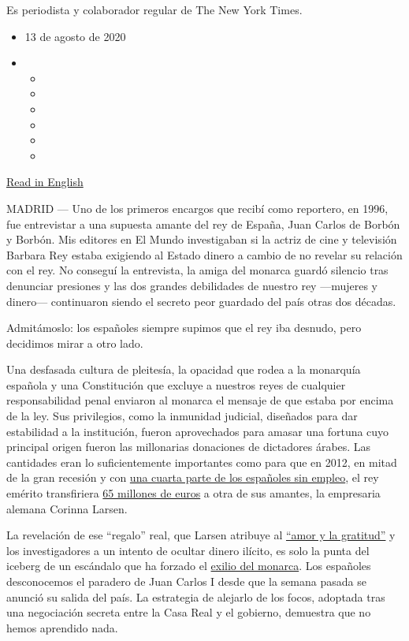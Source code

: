 Es periodista y colaborador regular de The New York Times.

\begin{itemize}
\item
  13 de agosto de 2020
\item
  \begin{itemize}
  \item
  \item
  \item
  \item
  \item
  \item
  \end{itemize}
\end{itemize}

\href{https://www.nytimes3xbfgragh.onion/2020/08/13/opinion/king-juan-carlos-exile.html}{Read
in English}

MADRID --- Uno de los primeros encargos que recibí como reportero, en
1996, fue entrevistar a una supuesta amante del rey de España, Juan
Carlos de Borbón y Borbón. Mis editores en El Mundo investigaban si la
actriz de cine y televisión Barbara Rey estaba exigiendo al Estado
dinero a cambio de no revelar su relación con el rey. No conseguí la
entrevista, la amiga del monarca guardó silencio tras denunciar
presiones y las dos grandes debilidades de nuestro rey ---mujeres y
dinero--- continuaron siendo el secreto peor guardado del país otras dos
décadas.

Admitámoslo: los españoles siempre supimos que el rey iba desnudo, pero
decidimos mirar a otro lado.

Una desfasada cultura de pleitesía, la opacidad que rodea a la monarquía
española y una Constitución que excluye a nuestros reyes de cualquier
responsabilidad penal enviaron al monarca el mensaje de que estaba por
encima de la ley. Sus privilegios, como la inmunidad judicial, diseñados
para dar estabilidad a la institución, fueron aprovechados para amasar
una fortuna cuyo principal origen fueron las millonarias donaciones de
dictadores árabes. Las cantidades eran lo suficientemente importantes
como para que en 2012, en mitad de la gran recesión y con
\href{https://www.macrotrends.net/countries/ESP/spain/unemployment-rate}{una
cuarta parte de los españoles sin empleo}, el rey emérito transfiriera
\href{https://www.publico.es/politica/juan-carlos-i-reclamo-65-millones-corinna-larsen-despues-abdicar.html}{65
millones de euros} a otra de sus amantes, la empresaria alemana Corinna
Larsen.

La revelación de ese ``regalo'' real, que Larsen atribuye al
\href{https://english.elpais.com/spanish_news/2020-07-06/recipient-of-65m-from-spains-emeritus-king-claimed-money-was-a-gift-and-not-a-bid-to-hide-the-funds.html}{``amor
y la gratitud''} y los investigadores a un intento de ocultar dinero
ilícito, es solo la punta del iceberg de un escándalo que ha forzado el
\href{https://www.nytimes3xbfgragh.onion/es/2020/08/05/espanol/opinion/juan-carlos-exilio-espana.html}{exilio
del monarca}. Los españoles desconocemos el paradero de Juan Carlos I
desde que la semana pasada se anunció su salida del país. La estrategia
de alejarlo de los focos, adoptada tras una negociación secreta entre la
Casa Real y el gobierno, demuestra que no hemos aprendido nada.


